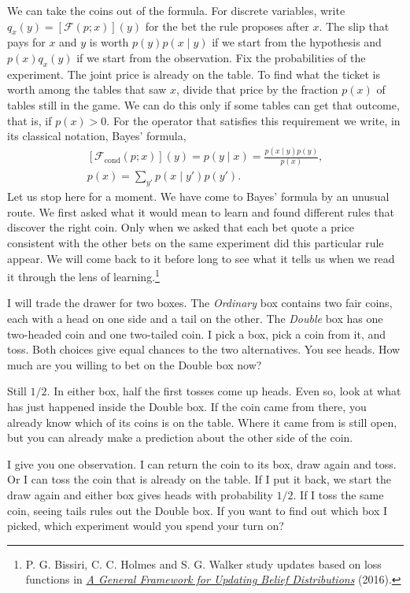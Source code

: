 We can take the coins out of the formula. For discrete variables, write $q_x(y)=[\mathcal F(p;x)](y)$ for the bet the rule proposes after $x$. The slip that pays for $x$ and $y$ is worth $p(y)p(x\mid y)$ if we start from the hypothesis and $p(x)q_x(y)$ if we start from the observation. Fix the probabilities of the experiment. The joint price is already on the table. To find what the ticket is worth among the tables that saw $x$, divide that price by the fraction $p(x)$ of tables still in the game. We can do this only if some tables can get that outcome, that is, if $p(x)>0$. For the operator that satisfies this requirement we write, in its classical notation, Bayes' formula,
\[
 \begin{gathered}
 [\mathcal F_{\mathrm{cond}}(p;x)](y)=p(y\mid x)
 =\frac{p(x\mid y)p(y)}{p(x)},\\[4pt]
 p(x)=\sum_{y'}p(x\mid y')p(y').
 \end{gathered}
\]
Let us stop here for a moment. We have come to Bayes' formula by an unusual route. We first asked what it would mean to learn and found different rules that discover the right coin. Only when we asked that each bet quote a price consistent with the other bets on the same experiment did this particular rule appear. We will come back to it before long to see what it tells us when we read it through the lens of learning.\footnote{P. G. Bissiri, C. C. Holmes and S. G. Walker study updates based on loss functions in \href{https://doi.org/10.1111/rssb.12158}{\emph{A General Framework for Updating Belief Distributions}} (2016).}

I will trade the drawer for two boxes. The \emph{Ordinary} box contains two fair coins, each with a head on one side and a tail on the other. The \emph{Double} box has one two-headed coin and one two-tailed coin. I pick a box, pick a coin from it, and toss. Both choices give equal chances to the two alternatives. You see heads. How much are you willing to bet on the Double box now?

Still \(1/2\). In either box, half the first tosses come up heads. Even so, look at what has just happened inside the Double box. If the coin came from there, you already know which of its coins is on the table. Where it came from is still open, but you can already make a prediction about the other side of the coin.

I give you one observation. I can return the coin to its box, draw again and toss. Or I can toss the coin that is already on the table. If I put it back, we start the draw again and either box gives heads with probability \(1/2\). If I toss the same coin, seeing tails rules out the Double box. If you want to find out which box I picked, which experiment would you spend your turn on?

